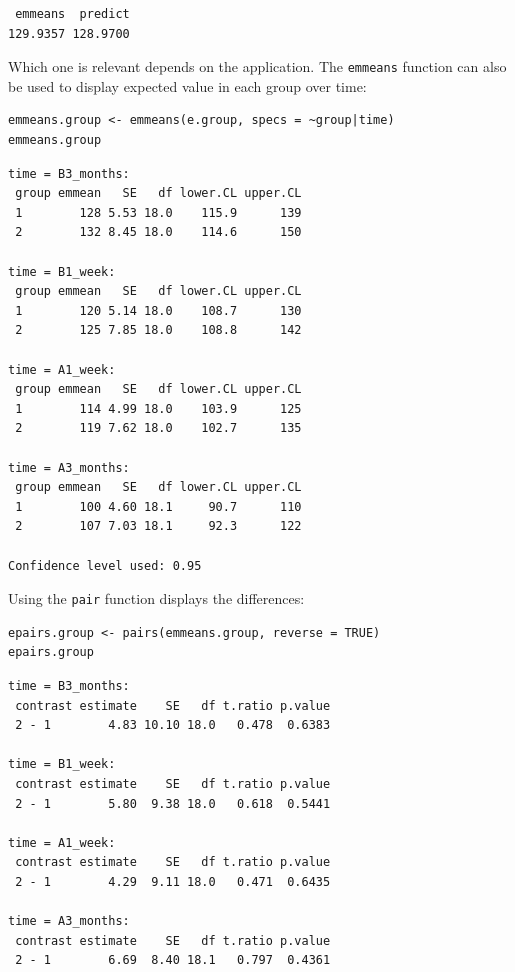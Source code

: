 \documentclass[12pt]{article}
\begin{document}
\begin{verbatim}
 emmeans  predict 
129.9357 128.9700
\end{verbatim}


Which one is relevant depends on the application. The \texttt{emmeans}
function can also be used to display expected value in each group over
time:
\lstset{language=r,label= ,caption= ,captionpos=b,numbers=none}
\begin{lstlisting}
emmeans.group <- emmeans(e.group, specs = ~group|time)
emmeans.group
\end{lstlisting}

\begin{verbatim}
time = B3_months:
 group emmean   SE   df lower.CL upper.CL
 1        128 5.53 18.0    115.9      139
 2        132 8.45 18.0    114.6      150

time = B1_week:
 group emmean   SE   df lower.CL upper.CL
 1        120 5.14 18.0    108.7      130
 2        125 7.85 18.0    108.8      142

time = A1_week:
 group emmean   SE   df lower.CL upper.CL
 1        114 4.99 18.0    103.9      125
 2        119 7.62 18.0    102.7      135

time = A3_months:
 group emmean   SE   df lower.CL upper.CL
 1        100 4.60 18.1     90.7      110
 2        107 7.03 18.1     92.3      122

Confidence level used: 0.95
\end{verbatim}

\clearpage

Using the \texttt{pair} function displays the differences:
\lstset{language=r,label= ,caption= ,captionpos=b,numbers=none}
\begin{lstlisting}
epairs.group <- pairs(emmeans.group, reverse = TRUE)
epairs.group
\end{lstlisting}

\begin{verbatim}
time = B3_months:
 contrast estimate    SE   df t.ratio p.value
 2 - 1        4.83 10.10 18.0   0.478  0.6383

time = B1_week:
 contrast estimate    SE   df t.ratio p.value
 2 - 1        5.80  9.38 18.0   0.618  0.5441

time = A1_week:
 contrast estimate    SE   df t.ratio p.value
 2 - 1        4.29  9.11 18.0   0.471  0.6435

time = A3_months:
 contrast estimate    SE   df t.ratio p.value
 2 - 1        6.69  8.40 18.1   0.797  0.4361
\end{verbatim}
\end{document}
